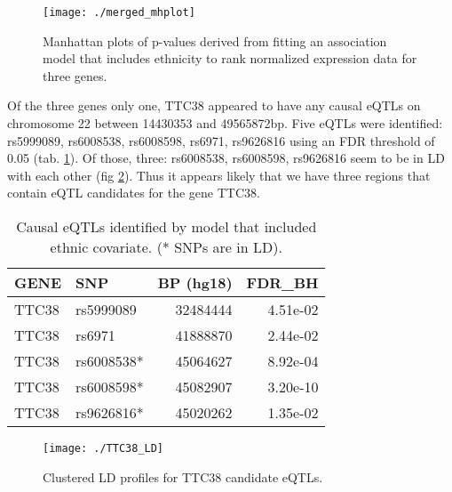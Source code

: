 \documentclass[12pt,a4paper]{article}
\begin{document}
\begin{figure}
\label{fig:merged_mhplot}
\texttt{[image: ./merged\_mhplot]}
\caption{Manhattan plots of p-values derived from fitting an association model that includes ethnicity to rank normalized expression data for three genes.}
\end{figure}

Of the three genes only one, TTC38 appeared to have any causal eQTLs on chromosome 22 between 14430353 and 49565872bp. Five eQTLs were identified: rs5999089, rs6008538, rs6008598, rs6971, rs9626816 using an FDR threshold of 0.05 (tab. \ref{eQTL_tab}). Of those, three: rs6008538, rs6008598, rs9626816 seem to be in LD with each other (fig \ref{fig:TTC38_LD}). Thus it appears likely that we have three regions that contain eQTL candidates for the gene TTC38.   

\begin{table}[h]
\centering
\begin{tabular}{llrr}
  \hline
GENE & SNP & BP (hg18) & FDR\_BH \\ 
  \hline
  TTC38 & rs5999089 & 32484444 & 4.51e-02 \\ 
  TTC38 & rs6971 & 41888870 & 2.44e-02 \\ 
  TTC38 & rs6008538* & 45064627 & 8.92e-04 \\ 
  TTC38 & rs6008598* & 45082907 & 3.20e-10 \\ 
  TTC38 & rs9626816* & 45020262 & 1.35e-02 \\ 
   \hline
\end{tabular}
\caption[eQTL]{Causal eQTLs identified by model that included ethnic covariate. (* SNPs are in LD). }
\label{eQTL_tab}
\end{table}

\begin{figure}
\centering
\texttt{[image: ./TTC38\_LD]}
\caption{Clustered LD profiles for TTC38 candidate eQTLs.}
\label{fig:TTC38_LD}
\end{figure}
\end{document}
